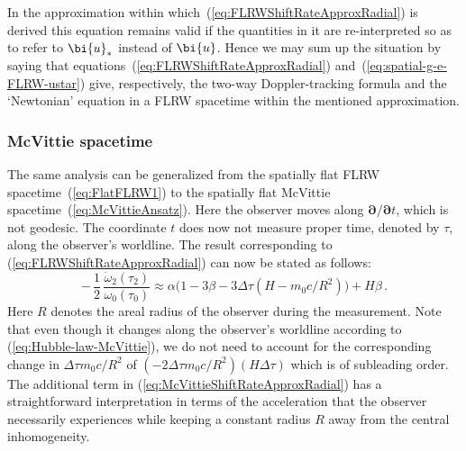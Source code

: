 \documentclass
[rmp,aps,twocolumn,showpacs,preprintnumbers,amsmath,amssymb]{revtex4}
\theoremstyle{plain}
\theoremstyle{definition}
\theoremstyle{remark}
\newcommand{\bpartial}{\boldsymbol{\partial}} %
\newcommand{\bu}{\bi{u}}
\begin{document}
In the approximation within which~(\ref{eq:FLRWShiftRateApproxRadial}) 
is derived this equation remains valid if the quantities in it are 
re-interpreted so as to refer to $\bu_*$ instead of $\bu$. Hence we 
may sum up the situation by saying that 
equations~(\ref{eq:FLRWShiftRateApproxRadial}) 
and~(\ref{eq:spatial-g-e-FLRW-ustar}) give, respectively, the 
two-way Doppler-tracking formula and the `Newtonian' equation in a 
FLRW spacetime within the mentioned approximation. 


\subsubsection{McVittie spacetime}
%
The same analysis can be generalized from the spatially flat FLRW 
spacetime~(\ref{eq:FlatFLRW1}) to the spatially flat McVittie 
spacetime~(\ref{eq:McVittieAnsatz}). 
Here the observer moves along $\bpartial/\bpartial t$, which is not 
geodesic. The coordinate $t$ does now not measure proper 
time, denoted by $\tau$,  along the observer's worldline. 
The result corresponding to (\ref{eq:FLRWShiftRateApproxRadial}) 
can now be stated as follows:
%
\begin{equation}
\label{eq:McVittieShiftRateApproxRadial}
-\,\frac{1}{2}\,\frac{\dot\omega_2(\tau_2)}{\omega_0(\tau_0)}
\approx \alpha\bigl(1-3\beta-3\Delta\tau(H-m_0c/R^2)\bigr)+H\beta\,.
\end{equation}
%
Here $R$ denotes the areal radius of the observer during the 
measurement. Note that even though it changes along the observer's  
worldline according to (\ref{eq:Hubble-law-McVittie}), 
we do not need to account for the corresponding change in 
$\Delta\tau m_0c/R^2$ of $(-2\Delta\tau m_0c/R^2)(H\Delta\tau)$
which is of subleading order. The additional term in 
(\ref{eq:McVittieShiftRateApproxRadial}) has a straightforward 
interpretation in terms of the acceleration that the observer 
necessarily experiences while keeping a constant radius $R$ 
away from the central inhomogeneity.    
\end{document}
